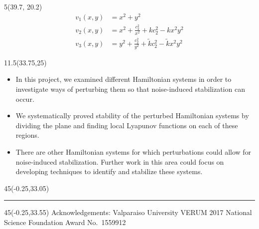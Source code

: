 \documentclass[a0]{a0poster}
\def\LHead#1{\colorbox{deepjunglegreen}{\noindent{\textbf{\Huge\color{white} #1}}\bigskip}}
\begin{document}
\begin{textblock}{5}(39.7, 20.2)
\begin{align*}
v_1(x,y) &= x^2 + y^2 \\
v_2(x,y) &= x^2+\frac{c_2^2}{x^2}+kc_2^2-kx^2y^2 \\
v_3(x,y) &= y^2+\frac{c_2^2}{y^2}+\tilde{k}c_2^2-\tilde{k}x^2y^2
\end{align*}
\end{textblock}



\begin{textblock}{11.5}(33.75,25)
\medskip
\LHead{\parbox{11.5in}{\begin{center}Conclusion\end{center}}}\\
\large
\begin{itemize}
\item In this project, we examined different Hamiltonian systems in order to investigate ways of perturbing them so that noise-induced stabilization can occur.
\item We systematically proved stability of the perturbed Hamiltonian systems by dividing the plane and finding local Lyapunov functions on each of these regions.
\item There are other Hamiltonian systems for which perturbations could allow for noise-induced stabilization.  Further work in this area could focus on developing techniques to identify and stabilize these systems.

\end{itemize}
\end{textblock}




\begin{textblock}{45}(-0.25,33.05)
\hspace{0in}
\hrule
\end{textblock}

\begin{textblock}{45}(-0.25,33.55)
\huge
\centering
Acknowledgements: \quad Valparaiso University \quad VERUM 2017 \quad National Science Foundation Award No.~1559912
\end{textblock}
\end{document}
